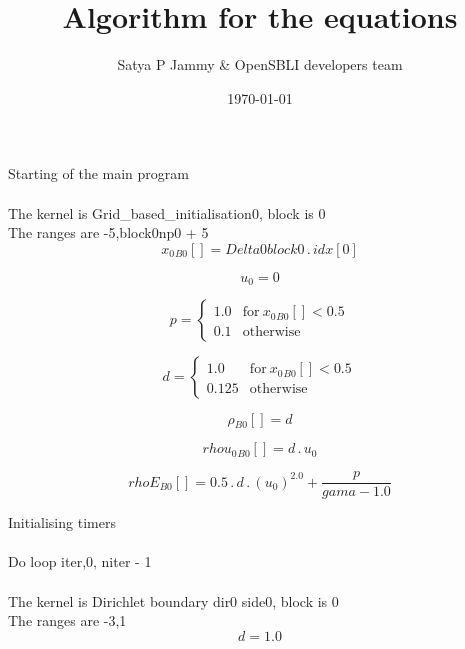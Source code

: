 \documentclass{article}
\title{Algorithm for the equations}
\author{Satya P Jammy \& OpenSBLI developers team}
\date{\today}
\begin{document}
\maketitle
\noindent Starting of the main program\\
\\\noindent The kernel is Grid_based_initialisation0, block is 0\\\noindent The ranges are -5,block0np0 + 5\\\begin{dmath}{x_{0}{_{B0}}}[{}] = Delta0block0 \,.\, {idx}[{0}]\end{dmath}

\begin{dmath}u_{0} = 0\end{dmath}

\begin{dmath}p = \begin{cases} 1.0 & \text{for}\: {x_{0}{_{B0}}}[{}] < 0.5 \\0.1 & \text{otherwise} \end{cases}\end{dmath}

\begin{dmath}d = \begin{cases} 1.0 & \text{for}\: {x_{0}{_{B0}}}[{}] < 0.5 \\0.125 & \text{otherwise} \end{cases}\end{dmath}

\begin{dmath}{\rho{_{B0}}}[{}] = d\end{dmath}

\begin{dmath}{rhou_{0}{_{B0}}}[{}] = d \,.\, u_{0}\end{dmath}

\begin{dmath}{rhoE{_{B0}}}[{}] = 0.5 \,.\, d \,.\, \left(u_{0} \right)^{2.0} + \frac{p}{gama - 1.0}\end{dmath}

\noindent Initialising timers\\
\\\noindent Do loop iter,0, niter - 1\\
\\\noindent The kernel is Dirichlet boundary dir0 side0, block is 0\\\noindent The ranges are -3,1\\\begin{dmath}d = 1.0\end{dmath}
\end{document}
